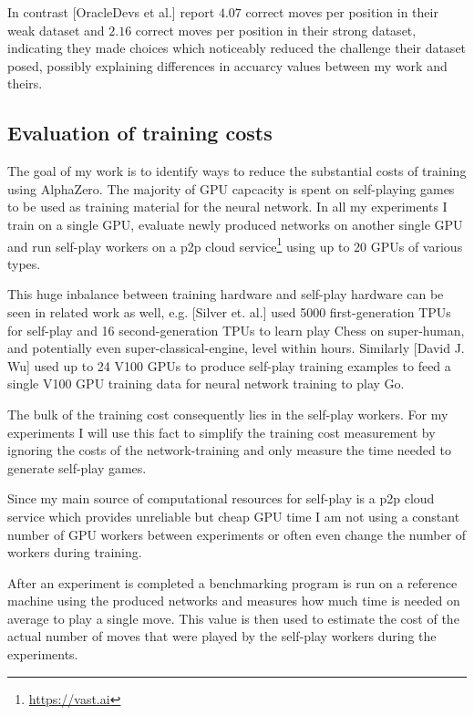 \documentclass[12pt,onecolumn,oneside,titlepage]{article}
\begin{document}
In contrast \cite{oracledevs}[OracleDevs et al.] report $4.07$ correct moves per position in their weak dataset and $2.16$ correct moves per position in their strong dataset, indicating they made choices which noticeably reduced the challenge their dataset posed, 
possibly explaining differences in accuarcy values between my work and theirs.

\subsection{Evaluation of training costs}

The goal of my work is to identify ways to reduce the substantial costs of training using AlphaZero. The majority of GPU capcacity is spent on self-playing games to be used as training material for the neural network.
In all my experiments I train on a single GPU, evaluate newly produced networks on another single GPU and run self-play workers on a p2p cloud service\footnote{\url{https://vast.ai}} using up to 20 GPUs of various types.

This huge inbalance between training hardware and self-play hardware can be seen in related work as well, e.g. \cite{AlphaZero}[Silver et. al.] used 5000 first-generation TPUs for self-play and 16 second-generation TPUs 
to learn play Chess on super-human, and potentially even super-classical-engine, level within hours. Similarly \cite{wu2019accelerating}[David J. Wu] used up to 24 V100 GPUs to produce self-play training examples to feed a single V100 GPU training data for neural network training to play Go.

The bulk of the training cost consequently lies in the self-play workers. For my experiments I will use this fact to simplify the training cost measurement by ignoring the costs of the network-training and only measure the time needed to generate self-play games.

Since my main source of computational resources for self-play is a p2p cloud service which provides unreliable but cheap GPU time I am not using a constant number of GPU workers between experiments or often even change the number of workers during training.

After an experiment is completed a benchmarking program is run on a reference machine using the produced networks and measures how much time is needed on average 
to play a single move. This value is then used to estimate the cost of the actual number of moves that were played by the self-play workers during the experiments.
\end{document}
